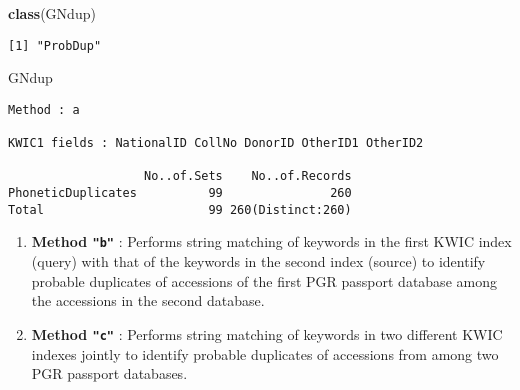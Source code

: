 \documentclass[]{article}
\newenvironment{Shaded}{\begin{snugshade}}{\end{snugshade}}
\newcommand{\KeywordTok}[1]{\textcolor[rgb]{0.13,0.29,0.53}{\textbf{#1}}}
\newcommand{\NormalTok}[1]{#1}
\begin{document}
\begin{Shaded}
\begin{Highlighting}[]
\KeywordTok{class}\NormalTok{(GNdup)}
\end{Highlighting}
\end{Shaded}

\begin{verbatim}
[1] "ProbDup"
\end{verbatim}

\begin{Shaded}
\begin{Highlighting}[]
\NormalTok{GNdup}
\end{Highlighting}
\end{Shaded}

\begin{verbatim}
Method : a

KWIC1 fields : NationalID CollNo DonorID OtherID1 OtherID2
 
                   No..of.Sets    No..of.Records
PhoneticDuplicates          99               260
Total                       99 260(Distinct:260)
\end{verbatim}

\begin{enumerate}
\def\labelenumi{\arabic{enumi}.}
\setcounter{enumi}{1}
\item
  \textbf{Method \texttt{"b"}} : Performs string matching of keywords in
  the first KWIC index (query) with that of the keywords in the second
  index (source) to identify probable duplicates of accessions of the
  first PGR passport database among the accessions in the second
  database.
\item
  \textbf{Method \texttt{"c"}} : Performs string matching of keywords in
  two different KWIC indexes jointly to identify probable duplicates of
  accessions from among two PGR passport databases.
\end{enumerate}
\end{document}
